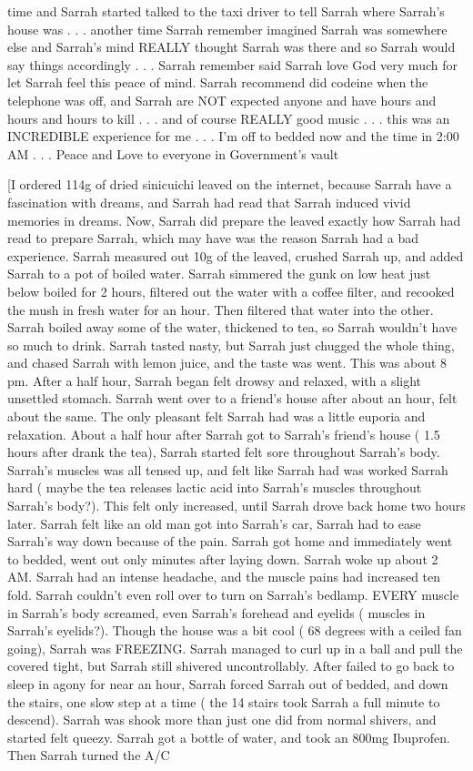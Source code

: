 \documentclass[12pt]{book}
\begin{document}
time and Sarrah started talked to the taxi driver to tell Sarrah where Sarrah's house was . . .  another time Sarrah remember imagined Sarrah was somewhere else and Sarrah's mind REALLY thought Sarrah was there and so Sarrah would say things accordingly . . .  Sarrah remember said Sarrah love God very much for let Sarrah feel this peace of mind. Sarrah recommend did codeine when the telephone was off, and Sarrah are NOT expected anyone and have hours and hours and hours to kill . . .  and of course REALLY good music . . .  this was an INCREDIBLE experience for me . . .  I'm off to bedded now and the time in 2:00 AM . . .  Peace and Love to everyone in Government's vault



[I ordered 114g of dried sinicuichi leaved on the internet, because Sarrah have a fascination with dreams, and Sarrah had read that Sarrah induced vivid memories in dreams. Now, Sarrah did prepare the leaved exactly how Sarrah had read to prepare Sarrah, which may have was the reason Sarrah had a bad experience. Sarrah measured out 10g of the leaved, crushed Sarrah up, and added Sarrah to a pot of boiled water. Sarrah simmered the gunk on low heat just below boiled for 2 hours, filtered out the water with a coffee filter, and recooked the mush in fresh water for an hour. Then filtered that water into the other. Sarrah boiled away some of the water, thickened to tea, so Sarrah wouldn't have so much to drink. Sarrah tasted nasty, but Sarrah just chugged the whole thing, and chased Sarrah with lemon juice, and the taste was went. This was about 8 pm. After a half hour, Sarrah began felt drowsy and relaxed, with a slight unsettled stomach. Sarrah went over to a friend's house after about an hour, felt about the same. The only pleasant felt Sarrah had was a little euporia and relaxation. About a half hour after Sarrah got to Sarrah's friend's house ( 1.5 hours after drank the tea), Sarrah started felt sore throughout Sarrah's body. Sarrah's muscles was all tensed up, and felt like Sarrah had was worked Sarrah hard ( maybe the tea releases lactic acid into Sarrah's muscles throughout Sarrah's body?). This felt only increased, until Sarrah drove back home two hours later. Sarrah felt like an old man got into Sarrah's car, Sarrah had to ease Sarrah's way down because of the pain. Sarrah got home and immediately went to bedded, went out only minutes after laying down. Sarrah woke up about 2 AM. Sarrah had an intense headache, and the muscle pains had increased ten fold. Sarrah couldn't even roll over to turn on Sarrah's bedlamp. EVERY muscle in Sarrah's body screamed, even Sarrah's forehead and eyelids ( muscles in Sarrah's eyelids?). Though the house was a bit cool ( 68 degrees with a ceiled fan going), Sarrah was FREEZING. Sarrah managed to curl up in a ball and pull the covered tight, but Sarrah still shivered uncontrollably. After failed to go back to sleep in agony for near an hour, Sarrah forced Sarrah out of bedded, and down the stairs, one slow step at a time ( the 14 stairs took Sarrah a full minute to descend). Sarrah was shook more than just one did from normal shivers, and started felt queezy. Sarrah got a bottle of water, and took an 800mg Ibuprofen. Then Sarrah turned the A/C 
\end{document}

